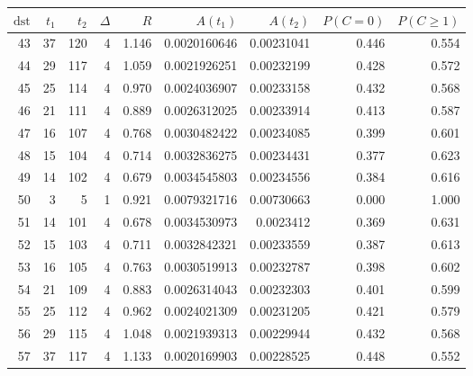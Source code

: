 \begin{tabular}{r r r r r r r r r}
\toprule
$\mathrm{dst}$ & $t_1$ & $t_2$ & $\Delta$ & $R$ & $A(t_1)$ & $A(t_2)$ & $P(C=0)$ & $P(C\ge1)$ \\
\midrule
43 & 37 & 120 & 4 & 1.146 & 0.0020160646 & 0.00231041 & 0.446 & 0.554 \\
44 & 29 & 117 & 4 & 1.059 & 0.0021926251 & 0.00232199 & 0.428 & 0.572 \\
45 & 25 & 114 & 4 & 0.970 & 0.0024036907 & 0.00233158 & 0.432 & 0.568 \\
46 & 21 & 111 & 4 & 0.889 & 0.0026312025 & 0.00233914 & 0.413 & 0.587 \\
47 & 16 & 107 & 4 & 0.768 & 0.0030482422 & 0.00234085 & 0.399 & 0.601 \\
48 & 15 & 104 & 4 & 0.714 & 0.0032836275 & 0.00234431 & 0.377 & 0.623 \\
49 & 14 & 102 & 4 & 0.679 & 0.0034545803 & 0.00234556 & 0.384 & 0.616 \\
50 & 3 & 5 & 1 & 0.921 & 0.0079321716 & 0.00730663 & 0.000 & 1.000 \\
51 & 14 & 101 & 4 & 0.678 & 0.0034530973 & 0.0023412 & 0.369 & 0.631 \\
52 & 15 & 103 & 4 & 0.711 & 0.0032842321 & 0.00233559 & 0.387 & 0.613 \\
53 & 16 & 105 & 4 & 0.763 & 0.0030519913 & 0.00232787 & 0.398 & 0.602 \\
54 & 21 & 109 & 4 & 0.883 & 0.0026314043 & 0.00232303 & 0.401 & 0.599 \\
55 & 25 & 112 & 4 & 0.962 & 0.0024021309 & 0.00231205 & 0.421 & 0.579 \\
56 & 29 & 115 & 4 & 1.048 & 0.0021939313 & 0.00229944 & 0.432 & 0.568 \\
57 & 37 & 117 & 4 & 1.133 & 0.0020169903 & 0.00228525 & 0.448 & 0.552 \\
\bottomrule
\end{tabular}
